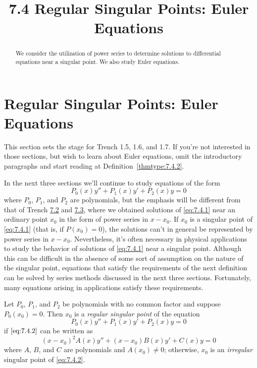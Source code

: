 \documentclass{ximera}
\title{7.4 Regular Singular Points:   Euler Equations}%
\begin{document}
\begin{abstract}
We consider the utilization of power series to determine solutions to differential equations near a singular point.  We also study Euler equations.
\end{abstract}

\maketitle

\section*{Regular Singular Points:   Euler Equations}

\begin{remark}This section sets the stage for Trench 1.5,
1.6,
and 1.7. If you're not interested in those sections, but wish
to learn about Euler equations, omit the introductory paragraphs
and start reading at Definition~\ref{thmtype:7.4.2}.
\end{remark}

In the next three sections we'll continue to study  equations of
the form
\begin{equation}\label{eq:7.4.1}
P_0(x)y''+P_1(x)y'+P_2(x)y=0
\end{equation}
where $P_0$, $P_1$, and $P_2$ are polynomials, but the emphasis will
be different from that of Trench \href{https://ximera.osu.edu/ode/main/seriesSolNearOrdinaryPtI/seriesSolNearOrdinaryPtI}{7.2} and \href{https://ximera.osu.edu/ode/main/seriesSolNearOrdinaryPtII/seriesSolNearOrdinaryPtII}{7.3},
where we
obtained solutions of \eqref{eq:7.4.1} near an ordinary point $x_0$ in the
form of power series in $x-x_0$. If $x_0$ is a singular point of
\eqref{eq:7.4.1} (that is, if $P(x_0)=0$),  the solutions can't in
general be represented by power series in $x-x_0$. Nevertheless, it's
often necessary in physical applications to study the behavior of
solutions of \eqref{eq:7.4.1} near a singular point. Although this can be
difficult in the absence of some sort of assumption on the nature of
the singular point, equations that satisfy the requirements of the
next definition can be solved by series methods discussed in the
next three sections. Fortunately, many equations arising in
applications satisfy these requirements.

\begin{definition}\label{thmtype:7.4.1}
Let $P_0$, $P_1$, and $P_2$ be polynomials with no common factor and
suppose  $P_0(x_0)=0$. Then $x_0$ is a \textit{regular singular
point} of the equation
\begin{equation} \label{eq:7.4.2}
P_0(x)y''+P_1(x)y'+P_2(x)y=0
\end{equation}
if $\eqref{eq:7.4.2}$ can be written as
\begin{equation} \label{eq:7.4.3}
(x-x_0)^2A(x)y''+(x-x_0)B(x)y'+C(x)y=0
\end{equation}
where $A$, $B$, and $C$ are polynomials and $A(x_0)\neq0$;   otherwise,
$x_0$ is an \textit{irregular} singular point of \eqref{eq:7.4.2}.
\end{definition}
\end{document}
